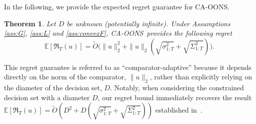\documentclass{article}
\renewcommand{\citet}{\citep}
\theoremstyle{plain}
\newtheorem{theorem}{Theorem}[section]
\theoremstyle{definition}
\theoremstyle{remark}
\newtheorem{remark}[theorem]{Remark}
\newcommand{\cawe}{{\sc CA-OONS}}
\newcommand{\regret}{\mathfrak{R}}
\newcommand{\inner}[2]{\left\langle #1, #2 \right\rangle}
\renewcommand{\tilde}{\widetilde}
\begin{document}
In the following, we provide the expected regret guarantee for \cawe.
\begin{theorem}\label{thm:unknownD}
Let $D$ be unknown (potentially infinite). Under Assumptions \ref{ass:G}, \ref{ass:L} and \ref{ass:convexF}, \cawe\ provides the following regret
\begin{equation}\label{eq:thmunknownD}
\mathbb{E}[\regret_T(u)]=\tilde{O}\Big(\|u\|_2^2+\|u\|_2(\sqrt{\sigma_{1:T}^2}+\sqrt{\Sigma_{1:T}^2})\Big).
\end{equation}
\end{theorem}

This regret guarantee is referred to as ``comparator-adaptive'' because it depends directly on the norm of the comparator, $\|u\|_2$, rather than explicitly relying on the diameter of the decision set, $D$. Notably, when considering the constrained decision set with a diameter $D$, our regret bound immediately recovers the result $\mathbb{E}[\regret_T(u)]=\tilde{O}(D^2+D(\sqrt{\sigma_{1:T}^2}+\sqrt{\Sigma_{1:T}^2}))$ established in~\citet{sachs2023accelerated,chen2024optimistic}. 


\end{document}
